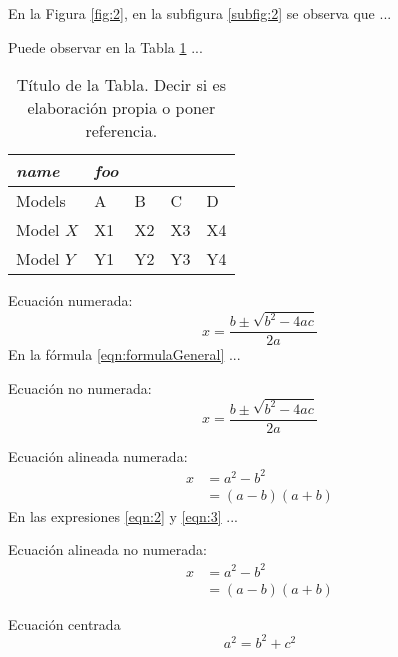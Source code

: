 \documentclass[fleqn]{Paquetes/RevDigMatEduInt}
\begin{document}
En la Figura \ref{fig:2}, en la subfigura \ref{subfig:2} se observa que ...


Puede observar en la Tabla \ref{tabla:nombre} ...

\begin{table}[ht!!!]
	\centering
	\begin{minipage}{0.7\textwidth}
	\caption{Título de la Tabla. Decir si es elaboración propia o poner referencia.}
	\centering
	\begin{tabular}{*5l}    \toprule
		\emph{name} & \emph{foo} & & &  \\ \midrule
		Models    & A  & B  & C  & D  \\ 
		Model $X$ & X1 & X2 & X3 & X4\\ 
		Model $Y$ & Y1 & Y2 & Y3 & Y4\\ \bottomrule
	\end{tabular}
	\label{tabla:nombre}
	\end{minipage}
\end{table}


Ecuación numerada:
\begin{equation}
	x=\frac{b\pm \sqrt{b^2-4ac}}{2a}
	\label{eqn:formulaGeneral}
\end{equation}
En la fórmula \ref{eqn:formulaGeneral} ...

Ecuación no numerada:
\begin{equation*}
	x=\frac{b\pm \sqrt{b^2-4ac}}{2a}
\end{equation*}

Ecuación alineada numerada:
\begin{align}
	x & = a^2-b^2 \label{eqn:2}\\
	& = (a-b)(a+b) \label{eqn:3}
\end{align}
En las expresiones \ref{eqn:2} y \ref{eqn:3} ...

Ecuación alineada no numerada:
\begin{align*}
	x & = a^2-b^2 \\
	& = (a-b)(a+b)
\end{align*}

Ecuación centrada \[ a^2=b^2+c^2 \]
\end{document}
